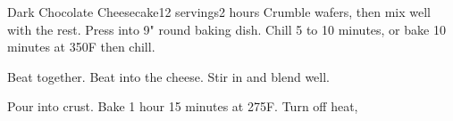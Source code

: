 \documentclass[../Cookbook.tex]{subfiles}
\begin{document}
\begin{recipe}[DarkChocolateCheesecake]{Dark Chocolate Cheesecake}{12 servings}{2 hours}
Crumble wafers, then mix well with the rest. Press into 9" round baking dish. Chill 5 to 10 minutes, or bake 10 minutes at 350\0F then chill.

Beat together.
Beat into the cheese.
Stir in and blend well.

Pour into crust. Bake 1 hour 15 minutes at 275\0F.
Turn off heat, %
\end{recipe}
\end{document}
